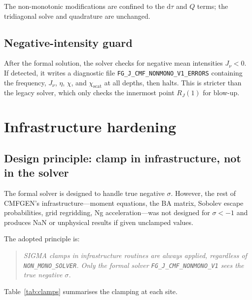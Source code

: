 \documentclass[11pt,a4paper]{article}
\begin{document}
The non-monotonic modifications are confined to the $\mathrm{d}\tau$ and
$Q$ terms; the tridiagonal solve and quadrature are unchanged.

\subsection{Negative-intensity guard}

After the formal solution, the solver checks for negative mean
intensities $J_\nu < 0$.  If detected, it writes a diagnostic file
\texttt{FG\_J\_CMF\_NONMONO\_V1\_ERRORS} containing the frequency,
$J_\nu$, $\eta$, $\chi$, and $\chi_{\mathrm{scat}}$ at all depths, then
halts.  This is stricter than the legacy solver, which only checks the
innermost point $R_J(1)$ for blow-up.

\section{Infrastructure hardening}
\label{sec:infra}

\subsection{Design principle: clamp in infrastructure, not in the solver}

The formal solver is designed to handle true negative $\sigma$.  However,
the rest of CMFGEN's infrastructure---moment equations, the BA matrix,
Sobolev escape probabilities, grid regridding, Ng acceleration---was not
designed for $\sigma < -1$ and produces NaN or unphysical results if
given unclamped values.

The adopted principle is:
\begin{quote}
  \emph{SIGMA clamps in infrastructure routines are always applied,
  regardless of \texttt{NON\_MONO\_SOLVER}.  Only the formal solver
  \texttt{FG\_J\_CMF\_NONMONO\_V1} sees the true negative $\sigma$.}
\end{quote}

Table~\ref{tab:clamps} summarises the clamping at each site.
\end{document}
